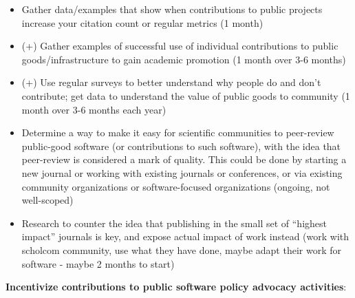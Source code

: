 \documentclass[
]{book}
\begin{document}
\begin{itemize}
\item
  Gather data/examples that show when contributions to public projects increase your citation
  count or regular metrics (1 month)
\item
  (+) Gather examples of successful use of individual contributions to public goods/infrastructure
  to gain academic promotion (1 month over 3-6 months)
\item
  (+) Use regular surveys to better understand why people do and don't contribute; get data to
  understand the value of public goods to community (1 month over 3-6 months each year)
\item
  Determine a way to make it easy for scientific communities to peer-review public-good software
  (or contributions to such software), with the idea that peer-review is considered a mark of
  quality. This could be done by starting a new journal or working with existing journals or conferences,
  or via existing community organizations or software-focused organizations (ongoing, not well-scoped)
\item
  Research to counter the idea that publishing in the small set of ``highest impact'' journals is
  key, and expose actual impact of work instead (work with scholcom community, use what they have
  done, maybe adapt their work for software - maybe 2 months to start)
\end{itemize}

\textbf{Incentivize contributions to public software policy advocacy activities}:
\end{document}
